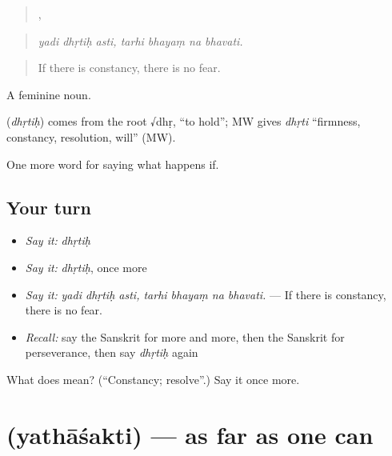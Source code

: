 \begin{quote}
  ,    
\end{quote}

\begin{quote}
\emph{yadi dhṛtiḥ asti, tarhi bhayaṃ na bhavati.}
\end{quote}

\begin{quote}
If there is constancy, there is no fear.
\end{quote}

A feminine noun.

\begin{cousinweb}
\textbf{} (\emph{dhṛtiḥ}) comes from the root √dhṛ, \textquotedblleft{}to hold\textquotedblright{}; MW gives \emph{dhṛti} \textquotedblleft{}firmness, constancy, resolution, will\textquotedblright{} (MW).
\end{cousinweb}

\begin{grammarlens}[title={What you've built}]
One more word for saying what happens if.
\end{grammarlens}

\subsection*{Your turn}
\begin{itemize}
\raggedright
  \item \emph{Say it:} \emph{dhṛtiḥ}
  \item \emph{Say it:} \emph{dhṛtiḥ}, once more
  \item \emph{Say it:} \emph{yadi dhṛtiḥ asti, tarhi bhayaṃ na bhavati.} — If there is constancy, there is no fear.
  \item \emph{Recall:} say the Sanskrit for more and more, then the Sanskrit for perseverance, then say \emph{dhṛtiḥ} again
\end{itemize}

\begin{tcolorbox}[breakable,colback=teal!4,colframe=teal!35!black,title={Before you move on}]
What does  mean? (\textquotedblleft{}Constancy; resolve\textquotedblright{}.) Say it once more.
\end{tcolorbox}
\section[\texorpdfstring{\sk{यथाशक्ति} (yathāśakti)}{यथाशक्ति (yathāśakti)}]{ (yathāśakti) — as far as one can}

